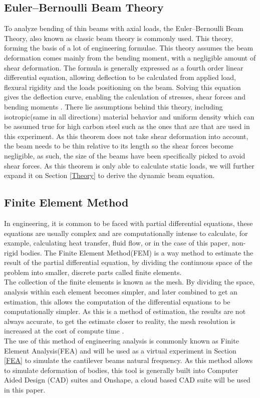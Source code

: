\documentclass[a4paper,12pt]{article}
\begin{document}
    \subsection{Euler–Bernoulli Beam Theory}\label{BeamTheory}%
    To analyze bending of thin beams with axial loads, the Euler–Bernoulli Beam Theory, also known as classic beam theory is commonly used.
    This theory, forming the basis of a lot of engineering formulae. This theory assumes the beam deformation comes mainly from the bending moment, with a negligible amount of shear deformation. The formula is generally expressed as a fourth order linear differential equation, allowing deflection to be calculated from applied load, flexural rigidity and the loads positioning on the beam. Solving this equation gives the deflection curve, enabling the calculation of stresses, shear forces and bending moments \autocite{EngMechanics}.
    There lie assumptions behind this theory, including isotropic(same in all directions) material behavior and uniform density which can be assumed true for high carbon steel such as the ones that are that are used in this experiment.\autocite{EngMechanics}
    As this theorem does not take shear deformation into account, the beam needs to be thin relative to its length so the shear forces become negligible, as such, the size of the beams have been specifically picked to avoid shear forces.
    As this theorem is only able to calculate static loads, we will further expand it on Section \ref{Theory} to derive the dynamic beam equation.

    \subsection{Finite Element Method}\label{FEM}%
    In engineering, it is common to be faced with partial differential equations, these equations are usually complex and are computationally intense to calculate, for example, calculating heat transfer, fluid flow, or in the case of this paper, non-rigid bodies.
    The Finite Element Method(FEM) is a way method to estimate the result of the partial differential equation, by dividing the continuous space of the problem into smaller, discrete parts called finite elements.\\
    The collection of the finite elements is known as the mesh. By dividing the space, analysis within each element becomes simpler, and later combined to get an estimation, this allows the computation of the differential equations to be computationally simpler. As this is a method of estimation, the results are not always accurate, to get the estimate closer to reality, the mesh resolution is increased at the cost of compute time \autocite{FEABook}. \\
    The use of this method of engineering analysis is commonly known as Finite Element Analysis(FEA) and will be used as a virtual experiment in Section \ref{FEA} to simulate the cantilever beams natural frequency.
    As this method allows to simulate deformation of bodies, this tool is generally built into Computer Aided Design (CAD) suites and Onshape, a cloud based CAD suite will be used in this paper.
\end{document}
